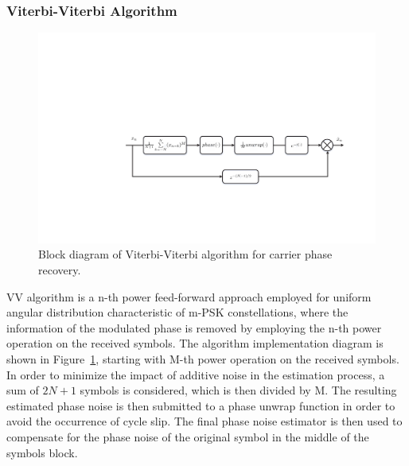 \subsubsection{Viterbi-Viterbi Algorithm}
\begin{figure}[h!]
    \centering
    \includegraphics[width=\textwidth]{./lib/carrier_phase_estimation/figures/VV_phaseEstimation.pdf}
    \caption{Block diagram of Viterbi-Viterbi algorithm for carrier phase recovery.}
    \label{fig_VVdiagram}
\end{figure}
VV algorithm is a n-th power feed-forward approach employed for uniform angular distribution characteristic of m-PSK constellations, where the information of the modulated phase is removed by employing the n-th power operation on the received symbols. The algorithm implementation diagram is shown in Figure~\ref{fig_VVdiagram}, starting with M-th power operation on the received symbols. In order to minimize the impact of additive noise in the estimation process, a sum of $2N+1$ symbols is considered, which is then divided by M. The resulting estimated phase noise is then submitted to a phase unwrap function in order to avoid the occurrence of cycle slip. The final phase noise estimator is then used to compensate for the phase noise of the original symbol in the middle of the symbols block.

